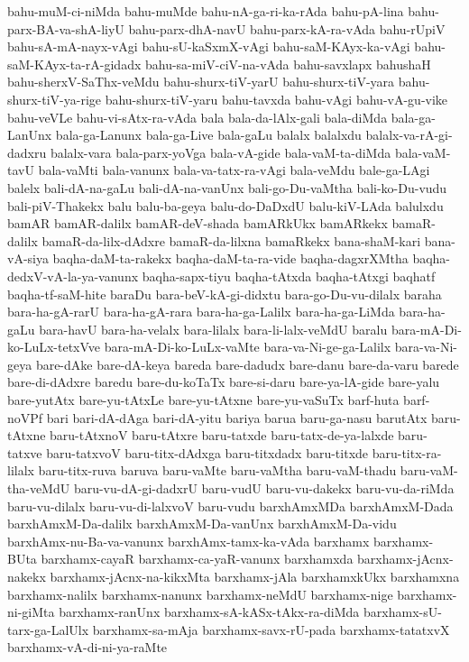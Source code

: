 {bahu-muM-ci-niMda
bahu-muMde
bahu-nA-ga-ri-ka-rAda
bahu-pA-lina
bahu-parx-BA-va-shA-liyU
bahu-parx-dhA-navU
bahu-parx-kA-ra-vAda
bahu-rUpiV
bahu-sA-mA-nayx-vAgi
bahu-sU-kaSxmX-vAgi
bahu-saM-KAyx-ka-vAgi
bahu-saM-KAyx-ta-rA-gidadx
bahu-sa-miV-ciV-na-vAda
bahu-savxlapx
bahushaH
bahu-sherxV-SaThx-veMdu
bahu-shurx-tiV-yarU
bahu-shurx-tiV-yara
bahu-shurx-tiV-ya-rige
bahu-shurx-tiV-yaru
bahu-tavxda
bahu-vAgi
bahu-vA-gu-vike
bahu-veVLe
bahu-vi-sAtx-ra-vAda
bala
bala-da-lAlx-gali
bala-diMda
bala-ga-LanUnx
bala-ga-Lanunx
bala-ga-Live
bala-gaLu
balalx
balalxdu
balalx-va-rA-gi-dadxru
balalx-vara
bala-parx-yoVga
bala-vA-gide
bala-vaM-ta-diMda
bala-vaM-tavU
bala-vaMti
bala-vanunx
bala-va-tatx-ra-vAgi
bala-veMdu
bale-ga-LAgi
balelx
bali-dA-na-gaLu
bali-dA-na-vanUnx
bali-go-Du-vaMtha
bali-ko-Du-vudu
bali-piV-Thakekx
balu
balu-ba-geya
balu-do-DaDxdU
balu-kiV-LAda
balulxdu
bamAR
bamAR-dalilx
bamAR-deV-shada
bamARkUkx
bamARkekx
bamaR-dalilx
bamaR-da-lilx-dAdxre
bamaR-da-lilxna
bamaRkekx
bana-shaM-kari
bana-vA-siya
baqha-daM-ta-rakekx
baqha-daM-ta-ra-vide
baqha-dagxrXMtha
baqha-dedxV-vA-la-ya-vanunx
baqha-sapx-tiyu
baqha-tAtxda
baqha-tAtxgi
baqhatf
baqha-tf-saM-hite
baraDu
bara-beV-kA-gi-didxtu
bara-go-Du-vu-dilalx
baraha
bara-ha-gA-rarU
bara-ha-gA-rara
bara-ha-ga-Lalilx
bara-ha-ga-LiMda
bara-ha-gaLu
bara-havU
bara-ha-velalx
bara-lilalx
bara-li-lalx-veMdU
baralu
bara-mA-Di-ko-LuLx-tetxVve
bara-mA-Di-ko-LuLx-vaMte
bara-va-Ni-ge-ga-Lalilx
bara-va-Ni-geya
bare-dAke
bare-dA-keya
bareda
bare-dadudx
bare-danu
bare-da-varu
barede
bare-di-dAdxre
baredu
bare-du-koTaTx
bare-si-daru
bare-ya-lA-gide
bare-yalu
bare-yutAtx
bare-yu-tAtxLe
bare-yu-tAtxne
bare-yu-vaSuTx
barf-huta
barf-noVPf
bari
bari-dA-dAga
bari-dA-yitu
bariya
barua
baru-ga-nasu
barutAtx
baru-tAtxne
baru-tAtxnoV
baru-tAtxre
baru-tatxde
baru-tatx-de-ya-lalxde
baru-tatxve
baru-tatxvoV
baru-titx-dAdxga
baru-titxdadx
baru-titxde
baru-titx-ra-lilalx
baru-titx-ruva
baruva
baru-vaMte
baru-vaMtha
baru-vaM-thadu
baru-vaM-tha-veMdU
baru-vu-dA-gi-dadxrU
baru-vudU
baru-vu-dakekx
baru-vu-da-riMda
baru-vu-dilalx
baru-vu-di-lalxvoV
baru-vudu
barxhAmxMDa
barxhAmxM-Dada
barxhAmxM-Da-dalilx
barxhAmxM-Da-vanUnx
barxhAmxM-Da-vidu
barxhAmx-nu-Ba-va-vanunx
barxhAmx-tamx-ka-vAda
barxhamx
barxhamx-BUta
barxhamx-cayaR
barxhamx-ca-yaR-vanunx
barxhamxda
barxhamx-jAcnx-nakekx
barxhamx-jAcnx-na-kikxMta
barxhamx-jAla
barxhamxkUkx
barxhamxna
barxhamx-nalilx
barxhamx-nanunx
barxhamx-neMdU
barxhamx-nige
barxhamx-ni-giMta
barxhamx-ranUnx
barxhamx-sA-kASx-tAkx-ra-diMda
barxhamx-sU-tarx-ga-LalUlx
barxhamx-sa-mAja
barxhamx-savx-rU-pada
barxhamx-tatatxvX
barxhamx-vA-di-ni-ya-raMte
}
